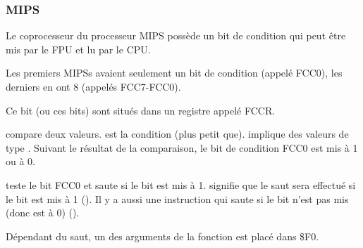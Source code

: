 \subsubsection{MIPS}

Le coprocesseur du processeur MIPS possède un bit de condition qui peut être mis
par le FPU et lu par le CPU.

Les premiers MIPSs avaient seulement un bit de condition (appelé FCC0), les derniers
en ont 8 (appelés FCC7-FCC0).

Ce bit (ou ces bits) sont situés dans un registre appelé FCCR.



 compare deux valeurs.
 est la condition  (plus petit que).
 implique des valeurs de type \Tdouble.
Suivant le résultat de la comparaison, le bit de condition FCC0 est mis à 1 ou à
0.

 teste le bit FCC0 et saute si le bit est mis à 1.
 signifie que le saut sera effectué si le bit est mis à 1 ().
Il y a aussi une instruction  qui saute si le bit n'est pas mis (donc
est à 0) ().

Dépendant du saut, un des arguments de la fonction est placé dans \$F0.
